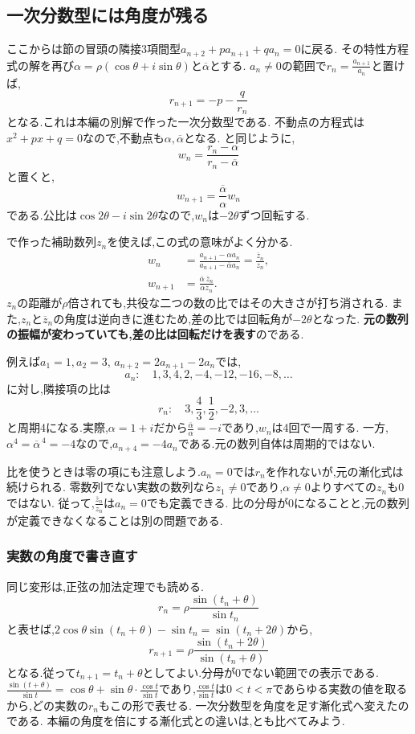 \subsection{一次分数型には角度が残る}\label{節：一次分数型には角度が残る}
ここからは節の冒頭の隣接3項間型$a_{n+2}+pa_{n+1}+qa_n=0$に戻る.
その特性方程式の解を再び$\alpha=\rho(\cos\theta+i\sin\theta)$と$\overline\alpha$とする.
$a_n\ne0$の範囲で$r_n=\frac{a_{n+1}}{a_n}$と置けば,
\[
  r_{n+1}=-p-\frac{q}{r_n}
\]
となる.これは本編の別解で作った一次分数型である.
不動点の方程式は$x^2+px+q=0$なので,不動点も$\alpha,\overline\alpha$となる.
と同じように,
\[
  w_n=\frac{r_n-\alpha}{r_n-\overline\alpha}
\]
と置くと,
\[
  w_{n+1}=\frac{\overline\alpha}{\alpha}w_n
\]
である.公比は$\cos2\theta-i\sin2\theta$なので,$w_n$は$-2\theta$ずつ回転する.

で作った補助数列$z_n$を使えば,この式の意味がよく分かる.
\[
  \begin{aligned}
    w_n&=\frac{a_{n+1}-\alpha a_n}{a_{n+1}-\overline\alpha a_n}
       =\frac{\overline z_n}{z_n},\\
    w_{n+1}&=\frac{\overline\alpha\,\overline z_n}{\alpha z_n}.
  \end{aligned}
\]
$z_n$の距離が$\rho$倍されても,共役な二つの数の比ではその大きさが打ち消される.
また,$z_n$と$\overline z_n$の角度は逆向きに進むため,差の比では回転角が$-2\theta$となった.
\textbf{元の数列の振幅が変わっていても,差の比は回転だけを表す}のである.

例えば$a_1=1,a_2=3$, $a_{n+2}=2a_{n+1}-2a_n$では,
\[
  a_n:\quad1,3,4,2,-4,-12,-16,-8,\ldots
\]
に対し,隣接項の比は
\[
  r_n:\quad3,\frac{4}{3},\frac{1}{2},-2,3,\ldots
\]
と周期4になる.実際,$\alpha=1+i$だから$\frac{\overline\alpha}{\alpha}=-i$であり,$w_n$は4回で一周する.
一方,$\alpha^4=\overline\alpha^{\,4}=-4$なので,$a_{n+4}=-4a_n$である.元の数列自体は周期的ではない.

比を使うときは零の項にも注意しよう.$a_n=0$では$r_n$を作れないが,元の漸化式は続けられる.
零数列でない実数の数列なら$z_1\ne0$であり,$\alpha\ne0$よりすべての$z_n$も0ではない.
従って,$\frac{\overline z_n}{z_n}$は$a_n=0$でも定義できる.
比の分母が0になることと,元の数列が定義できなくなることは別の問題である.

\subsubsection{実数の角度で書き直す}
同じ変形は,正弦の加法定理でも読める.
\[
  r_n=\rho\frac{\sin(t_n+\theta)}{\sin t_n}
\]
と表せば,$2\cos\theta\sin(t_n+\theta)-\sin t_n=\sin(t_n+2\theta)$から,
\[
  r_{n+1}=\rho\frac{\sin(t_n+2\theta)}{\sin(t_n+\theta)}
\]
となる.従って$t_{n+1}=t_n+\theta$としてよい.分母が0でない範囲での表示である.
$\frac{\sin(t+\theta)}{\sin t}=\cos\theta+\sin\theta\cdot\frac{\cos t}{\sin t}$であり,$\frac{\cos t}{\sin t}$は$0<t<\pi$であらゆる実数の値を取るから,どの実数の$r_n$もこの形で表せる.
一次分数型を角度を足す漸化式へ変えたのである.
本編の角度を倍にする漸化式との違いは,とも比べてみよう.

